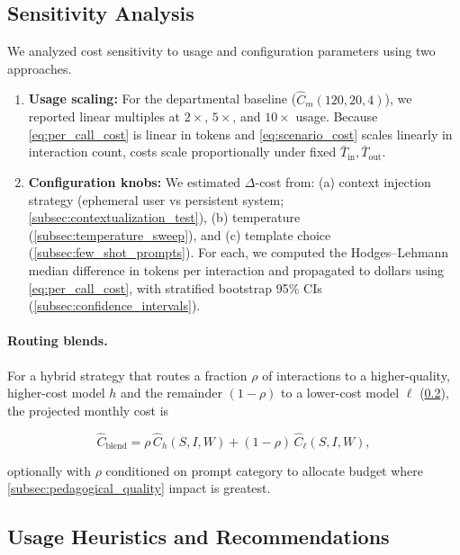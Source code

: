 \subsection{Sensitivity Analysis}\label{subsec:sensitivity_analysis}

We analyzed cost sensitivity to usage and configuration parameters using two approaches.

\begin{enumerate}
	\item \textbf{Usage scaling:} For the departmental baseline \big($\widehat{C}_m(120,20,4)$\big), we reported linear multiples at $2\times$, $5\times$, and $10\times$ usage. Because \cref{eq:per_call_cost} is linear in tokens and \cref{eq:scenario_cost} scales linearly in interaction count, costs scale proportionally under fixed $\bar{T}_{\text{in}}, \bar{T}_{\text{out}}$.
	\item \textbf{Configuration knobs:} We estimated $\Delta$-cost from: (a) context injection strategy (ephemeral user vs persistent system; \cref{subsec:contextualization_test}), (b) temperature (\cref{subsec:temperature_sweep}), and (c) template choice (\cref{subsec:few_shot_prompts}). For each, we computed the Hodges--Lehmann median difference in tokens per interaction and propagated to dollars using \cref{eq:per_call_cost}, with stratified bootstrap 95\% CIs (\cref{subsec:confidence_intervals}).
\end{enumerate}

\paragraph{Routing blends.} For a hybrid strategy that routes a fraction $\rho$ of interactions to a higher-quality, higher-cost model $h$ and the remainder $(1-\rho)$ to a lower-cost model $\ell$ (\cref{subsec:usage_heuristics}), the projected monthly cost is

\begin{equation}
\label{eq:routing_cost}
\widehat{C}_{\text{blend}} = \rho\, \widehat{C}_h(S,I,W) + (1-\rho)\, \widehat{C}_\ell(S,I,W),
\end{equation}

optionally with $\rho$ conditioned on prompt category to allocate budget where \cref{subsec:pedagogical_quality} impact is greatest.

\subsection{Usage Heuristics and Recommendations}\label{subsec:usage_heuristics}

